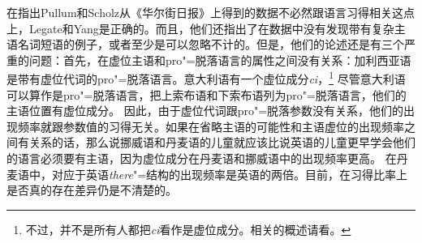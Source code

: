 在指出Pullum和Scholz从《华尔街日报》上得到的数据不必然跟语言习得相关这点上，Legate和Yang是正确的。而且，他们还指出了在数据中没有发现带有复杂主语名词短语的例子，或者至少是可以忽略不计的。但是，他们的论述还是有三个严重的问题：首先，在虚位主语和pro"=脱落语言的属性之间没有关系：加利西亚语 \citep[Section~2.5]{RU90a-u}是带有虚位代词的pro"=脱落语言。意大利语有一个虚位成分\emph{ci}，\footnote{
不过，并不是所有人都把\emph{ci}看作是虚位成分。相关的概述请看。
} 尽管意大利语可以算作是pro"=脱落语言，\citet{Franks95a-u}把上索布语和下索布语列为pro"=脱落语言，他们的主语位置有虚位成分。
因此，由于虚位代词跟pro"=脱落参数没有关系，他们的出现频率就跟参数值的习得无关。如果在省略主语的可能性和主语虚位的出现频率之间有关系的话，那么说挪威语和丹麦语的儿童就应该比说英语的儿童更早学会他们的语言必须要有主语，因为虚位成分在丹麦语和挪威语中的出现频率更高\citep[]{SP2002b}。
在丹麦语中，对应于英语\emph{there}"=结构的出现频率是英语的两倍。目前，在习得比率上是否真的存在差异仍是不清楚的\citep[]{Pullum2009a}。

